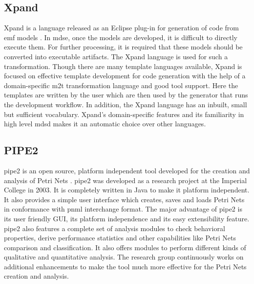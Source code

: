 \subsection{Xpand}
Xpand is a language released as an Eclipse plug-in for generation of code from \gls{emf} models \cite{xpand}. In \gls{mdse}, once the models are developed, it is difficult to directly execute them. For further processing, it is required that these models should be converted into executable artifacts. The Xpand language is used for such a transformation. Though there are many template languages available, Xpand is focused on effective template development for code generation with the help of a domain-specific \gls{m2t} transformation language and good tool support. Here the templates are written by the user which are then used by the generator that runs the development workflow. In addition, the Xpand language has an inbuilt, small but sufficient vocabulary. Xpand’s domain-specific features and its familiarity in high level \gls{mdsd} makes it an automatic choice over other languages. 

\subsection{PIPE2}
\gls{pipe2} is an open source, platform independent tool developed for the creation and analysis of Petri Nets \cite{bonet2007pipe}. \gls{pipe2} was developed as a research project at the Imperial College in 2003.  It is completely written in Java to make it platform independent. It also provides a simple user interface which creates, saves and loads Petri Nets in conformance with \gls{pnml} interchange format. The major advantage of \gls{pipe2} is its user friendly GUI, its platform independence and its easy extensibility feature. \gls{pipe2} also features a complete set of analysis modules to check behavioral properties, derive performance statistics and other capabilities like Petri Nets comparison and classification. It also offers modules to perform different kinds of qualitative and quantitative analysis. The research group continuously works on additional enhancements to make the tool much more effective for the Petri Nets creation and analysis.
